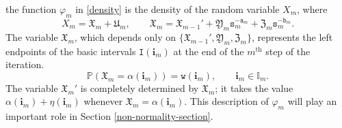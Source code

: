 \documentclass[12pt, twoside]{article}
\theoremstyle{definition}
\numberwithin{equation}{section}
\begin{document}
the function $\varphi_m$ in \eqref{density} is the density of the random variable $X_m$, where
\begin{equation}  X_m = \mathfrak X_m + \mathfrak U_m, \qquad \mathfrak X_m = \mathfrak X_{m-1}' + \mathfrak Y_m \mathtt s_m^{-\mathtt a_m}+ \mathfrak Z_m \mathtt s_m^{-\mathtt b_m}.  \label{XmYmZmUm} 
\end{equation}  
The variable $\mathfrak X_m$, which depends only on $\{\mathfrak X_{m-1}', \mathfrak Y_m, \mathfrak Z_m\}$, represents the left endpoints of the basic intervals $\mathtt I(\mathbf i_m)$ at the end of the $m^{\text{th}}$ step of the iteration. 
\[ \mathbb P(\mathfrak X_m = \alpha(\mathbf i_m)) = \mathtt w(\mathbf i_m), \qquad \mathbf i_m \in \mathbb I_m. \]  
The variable $\mathfrak X_{m}'$ is completely determined by $\mathfrak X_m$; it takes the value $\alpha(\mathbf i_{m}) + \eta(\mathbf i_{m})$ whenever $\mathfrak X_{m} = \alpha(\mathbf i_{m})$. This description of $\varphi_m$ will play an important role in Section \ref{non-normality-section}.  
\end{document}
